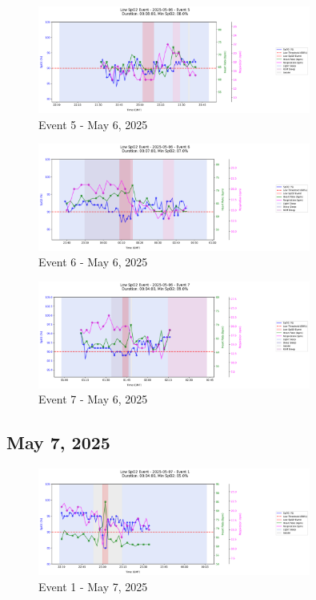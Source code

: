 \documentclass{article}
\begin{document}
\begin{figure}[htbp]
    \centering
    \includegraphics[width=0.8\textwidth]{images/2025-05-06_event_5.png}
    \caption{Event 5 - May 6, 2025}
\end{figure}
\begin{figure}[htbp]
    \centering
    \includegraphics[width=0.8\textwidth]{images/2025-05-06_event_6.png}
    \caption{Event 6 - May 6, 2025}
\end{figure}
\begin{figure}[htbp]
    \centering
    \includegraphics[width=0.8\textwidth]{images/2025-05-06_event_7.png}
    \caption{Event 7 - May 6, 2025}
\end{figure}
\clearpage

\subsection{May 7, 2025}
\begin{figure}[htbp]
    \centering
    \includegraphics[width=0.8\textwidth]{images/2025-05-07_event_1.png}
    \caption{Event 1 - May 7, 2025}
\end{figure}
\clearpage
\end{document}
